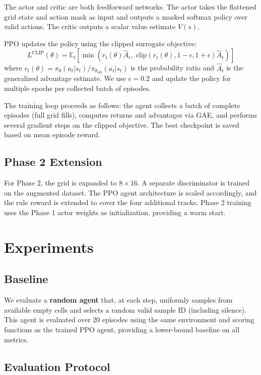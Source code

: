 \documentclass[11pt]{article}
\begin{document}
The actor and critic are both feedforward networks. The actor takes the flattened grid state and action mask as input and outputs a masked softmax policy over valid actions. The critic outputs a scalar value estimate $V(s)$.

PPO updates the policy using the clipped surrogate objective:
\[
L^{\text{CLIP}}(\theta) = \mathbb{E}_t \left[ \min\left( r_t(\theta) \hat{A}_t,\; \text{clip}(r_t(\theta), 1-\epsilon, 1+\epsilon) \hat{A}_t \right) \right]
\]
where $r_t(\theta) = \pi_\theta(a_t | s_t) / \pi_{\theta_{\text{old}}}(a_t | s_t)$ is the probability ratio and $\hat{A}_t$ is the generalized advantage estimate. We use $\epsilon = 0.2$ and update the policy for multiple epochs per collected batch of episodes.

The training loop proceeds as follows: the agent collects a batch of complete episodes (full grid fills), computes returns and advantages via GAE, and performs several gradient steps on the clipped objective. The best checkpoint is saved based on mean episode reward.

\subsection{Phase 2 Extension}

For Phase 2, the grid is expanded to $8 \times 16$. A separate discriminator is trained on the augmented dataset. The PPO agent architecture is scaled accordingly, and the rule reward is extended to cover the four additional tracks. Phase 2 training uses the Phase 1 actor weights as initialization, providing a warm start.

\section{Experiments}

\subsection{Baseline}

We evaluate a \textbf{random agent} that, at each step, uniformly samples from available empty cells and selects a random valid sample ID (including silence). This agent is evaluated over 20 episodes using the same environment and scoring functions as the trained PPO agent, providing a lower-bound baseline on all metrics.

\subsection{Evaluation Protocol}
\end{document}
